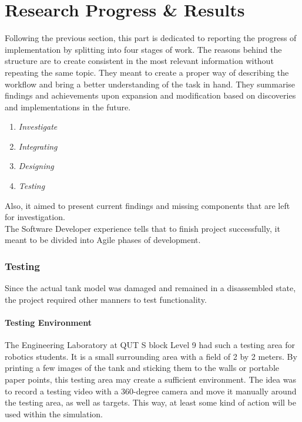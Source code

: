 \chapter{Research Progress \& Results}
Following the previous section, this part is dedicated to reporting the progress of implementation by splitting into four stages of work.
The reasons behind the structure are to create consistent in the most relevant information without repeating the same topic.
They meant to create a proper way of describing the workflow and bring a better understanding of the task in hand.
They summarise findings and achievements upon expansion and modification based on discoveries and implementations in the future.
\begin{multicols}{2}
\begin{enumerate}
    \item \textit{Investigate}
    \item \textit{Integrating}
    \item \textit{Designing}
    \item \textit{Testing}
\end{enumerate}
\end{multicols}
Also, it aimed to present current findings and missing components that are left for investigation. \\
The Software Developer experience tells that to finish project successfully, it meant to be divided into Agile phases of development.



\subsection{Testing}
Since the actual tank model was damaged and remained in a disassembled state, the project required other manners to test functionality.
\subsubsection{Testing Environment}
The Engineering Laboratory at QUT S block Level 9 had such a testing area for robotics students.
It is a small surrounding area with a field of 2 by 2 meters.
By printing a few images of the tank and sticking them to the walls or portable paper points, this testing area may create a sufficient environment.
The idea was to record a testing video with a 360-degree camera and move it manually around the testing area, as well as targets.
This way, at least some kind of action will be used within the simulation.\\[1pt]
